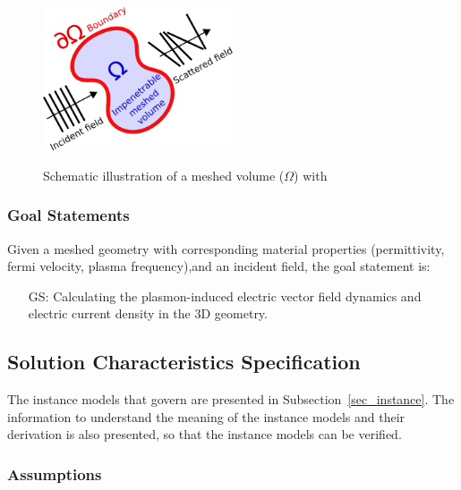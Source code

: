 \documentclass[12pt]{article}
\newcounter{goalnum} %
\begin{document}
	
	\begin{figure}[h!] \begin{center} %
			{ \includegraphics[width=0.5\textwidth]{physical_system.png} }
			\caption{\label{fig:system} Schematic illustration of a meshed volume
				($\Omega$) with  } \end{center} \end{figure}
	
	\subsubsection{Goal Statements} \label{goalstat} Given a meshed geometry with
	corresponding material properties (permittivity, fermi velocity, plasma
	frequency),and an incident field, the goal statement is:
	
	
	\begin{itemize}
		
		\item[GS\refstepcounter{goalnum}\thegoalnum \label{GS1}:] Calculating the
		plasmon-induced electric vector field dynamics and electric current density in
		the 3D geometry.
		
	\end{itemize}
	
	\subsection{Solution Characteristics Specification}

	
	The instance models that govern \progname{} are presented in
	Subsection~\ref{sec_instance}.  The information to understand the meaning of the
	instance models and their derivation is also presented, so that the instance
	models can be verified.
	
	\subsubsection{Assumptions} \label{sec_assumpt}
	
\end{document}
